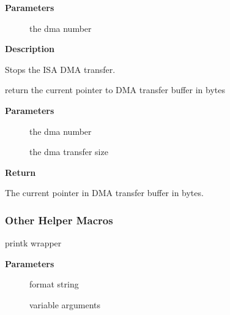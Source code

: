 \documentclass[a4paper,8pt,english]{sphinxmanual}
\begin{document}
\textbf{Parameters}
\begin{description}
\item[{}] \leavevmode
the dma number

\end{description}

\textbf{Description}

Stops the ISA DMA transfer.

\begin{fulllineitems}
\label{sound/kernel-api/alsa-driver-api:c.snd_dma_pointer}
return the current pointer to DMA transfer buffer in bytes

\end{fulllineitems}


\textbf{Parameters}
\begin{description}
\item[{}] \leavevmode
the dma number

\item[{}] \leavevmode
the dma transfer size

\end{description}

\textbf{Return}

The current pointer in DMA transfer buffer in bytes.


\subsubsection{Other Helper Macros}
\label{sound/kernel-api/alsa-driver-api:other-helper-macros}

\begin{fulllineitems}
\label{sound/kernel-api/alsa-driver-api:c.snd_printk}
printk wrapper

\end{fulllineitems}


\textbf{Parameters}
\begin{description}
\item[{}] \leavevmode
format string

\item[{}] \leavevmode
variable arguments

\end{description}
\end{document}
